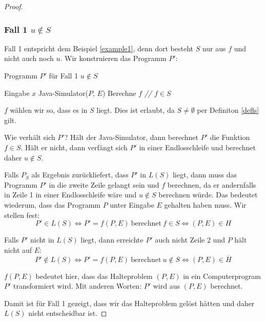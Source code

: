\documentclass[journal]{IEEEtran}
\begin{document}
\begin{proof}
\subsubsection{Fall 1 $u \notin S$}

Fall 1 entspricht dem Beispiel \ref{example1}, denn dort besteht $S$ nur aus $f$ und nicht auch noch $u$. Wir konstruieren das Programm $P'$:

\begin{algorithm}
\caption{Programm $P'$ für Fall 1 $u \notin S$}
\begin{algorithmic}[1]
\renewcommand{\algorithmicrequire}{\textbf{Input:}}
\renewcommand{\algorithmicensure}{\textbf{Output:}}
\REQUIRE Eingabe $x$
\STATE Java-Simulator($P$, $E$)
\STATE Berechne $f$ \textit{// $f \in S$}
\end{algorithmic}
\end{algorithm}

$f$ wählen wir so, dass es in $S$ liegt. Dies ist erlaubt, da $S \ne \emptyset$ per Definiton \ref{defls} gilt.

Wie verhält sich $P'$? Hält der Java-Simulator, dann berechnet $P'$ die Funktion $f \in S$. Hält er nicht, dann verfängt sich $P'$ in einer Endlosschleife und berechnet daher $u \notin S$.

Falls $P_S$ als Ergebnis zurückliefert, dass $P'$ in $L(S)$ liegt, dann muss das Programm $P'$ in die zweite Zeile gelangt sein und $f$ berechnen, da er andernfalls in Zeile 1 in einer Endlosschleife wäre und $u \notin S$ berechnen würde. Das bedeutet wiederum, dass das Programm $P$ unter Eingabe $E$ gehalten haben muss. Wir stellen fest:
\begin{equation*}
P' \in L(S) \Leftrightarrow P' = f(P, E) \ \text{berechnet} \ f \in S \Leftrightarrow (P, E) \in H
\end{equation*}

Falls $P'$ nicht in $L(S)$ liegt, dann erreichte $P'$ auch nicht Zeile 2 und $P$ hält nicht auf $E$:
\begin{equation*}
P' \notin L(S) \Leftrightarrow P' = f(P, E) \ \text{berechnet} \ u \notin S \Leftrightarrow (P, E) \in \overline{H}
\end{equation*}

$f(P, E)$ bedeutet hier, dass das Halteproblem $(P, E)$ in ein Computerprogram $P'$ transformiert wird. Mit anderen Worten: $P'$ wird aus $(P, E)$ berechnet.

Damit ist für Fall 1 gezeigt, dass wir das Halteproblem gelöst hätten und daher $L(S)$ nicht entscheidbar ist.


\end{proof}
\end{document}
